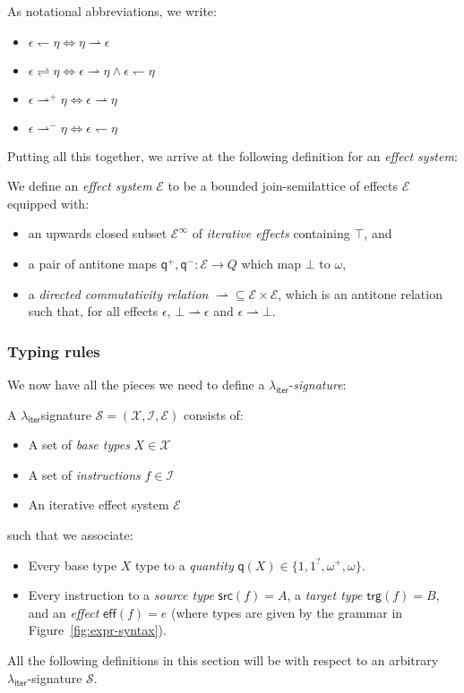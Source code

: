 \documentclass[acmsmall,screen,review]{acmart}
\newcommand{\mc}[1]{\ensuremath{\mathcal{#1}}}
\newcommand{\ms}[1]{\ensuremath{\mathsf{#1}}}
\newcommand{\subiterexp}{\(\lambda_{\ms{iter}}\)}
\newcommand{\rightmove}{\rightharpoonup}
\newcommand{\leftmove}{\leftharpoondown}
\newcommand{\slides}{\rightleftharpoons}
\newcommand{\delq}{1^?}
\newcommand{\cpyq}{\omega^+}
\newcommand{\topq}{\omega}
\newcommand{\alquant}{\ms{q}}
\begin{document}
As notational abbreviations, we write:
\begin{itemize}
  \item $\epsilon \leftmove \eta \iff \eta \rightmove \epsilon$
  \item $\epsilon \slides \eta \iff \epsilon \rightmove \eta \land \epsilon \leftmove \eta$
  \item $\epsilon \rightmove^+ \eta \iff \epsilon \rightmove \eta$
  \item $\epsilon \rightmove^- \eta \iff \epsilon \leftmove \eta$
\end{itemize}

Putting all this together, we arrive at the following definition for an
\emph{effect system}:
\begin{definition}
  We define an \emph{effect system} $\mc{E}$ to be a bounded join-semilattice of effects $\mc{E}$
  equipped with:
  \begin{itemize}
  \item an upwards closed subset $\mc{E}^\infty$ of \emph{iterative effects} containing $\top$, and
  \item a pair of antitone maps $\alquant^+, \alquant^- : \mc{E} \to Q$ which map $\bot$ to $\topq$,
  \item a \emph{directed commutativity relation} $\rightmove \subseteq \mc{E} \times \mc{E}$,
  which is an antitone relation   such that, for all effects
  $\epsilon$, $\bot \rightmove \epsilon$ and $\epsilon \rightmove \bot$. 
  \end{itemize}

\end{definition}


\subsubsection{Typing rules}

We now have all the pieces we need to define a \subiterexp{}-\emph{signature}:
\begin{definition}[\subiterexp-signature]
  A \subiterexp signature $\mc{S} = (\mc{X}, \mc{I}, \mc{E})$ consists of:
  \begin{itemize}
    \item A set of \emph{base types} $X \in \mc{X}$
    \item A set of \emph{instructions} $f \in \mc{I}$
    \item An iterative effect system $\mc{E}$
  \end{itemize}
  such that we associate:
  \begin{itemize}
    \item Every base type $X$ type to a \emph{quantity} $\ms{q}(X) \in \{1, \delq, \cpyq, \topq\}$.
    \item Every instruction to a \emph{source type} $\ms{src}(f) = A$, a \emph{target type}
    $\ms{trg}(f) = B$, and an \emph{effect} $\ms{eff}(f) = e$ (where types are given by the grammar
    in Figure~\ref{fig:expr-syntax}).
  \end{itemize}
\end{definition}
All the following definitions in this section will be with respect to an arbitrary
\subiterexp{}-signature $\mc{S}$. 
\end{document}

